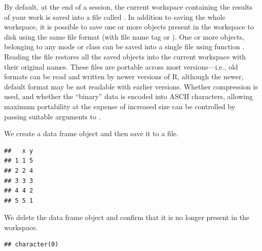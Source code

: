 \documentclass[krantz2]{krantz}\usepackage{knitr}
\begin{document}
By default, at the end of a session, the current workspace containing the results of your work is saved into a file called . In addition to saving the whole workspace, it is possible to save one or more \Rlang objects present in the workspace to disk using the same file format (with file name tag  or ). One or more objects, belonging to any mode or class can be saved into a single file using function . Reading the file restores all the saved objects into the current workspace with their original names. These files are portable across most \Rlang versions---i.e., old formats can be read and written by newer versions of R, although the newer, default format may be not readable with earlier \Rlang versions. Whether compression is used, and whether the ``binary'' data is encoded into ASCII characters, allowing maximum portability at the expense of increased size can be controlled by passing suitable arguments to .

We create a data frame object and then save it to a file.

\begin{knitrout}\footnotesize
{}\color{fgcolor}\begin{kframe}
\begin{alltt}
 \hlkwb{<-} \hlstd{(} \hlstd{=} \hlopt{:}\hlstd{,}  \hlstd{=} \hlopt{:}\hlstd{)}
\end{alltt}
\begin{verbatim}
##   x y
## 1 1 5
## 2 2 4
## 3 3 3
## 4 4 2
## 5 5 1
\end{verbatim}
\begin{alltt}
  \hlstd{=} \hlstd{)}
\end{alltt}
\end{kframe}
\end{knitrout}

We delete the data frame object and confirm that it is no longer present in the workspace.

\begin{knitrout}\footnotesize
{}\color{fgcolor}\begin{kframe}
\begin{alltt}
\hlstd{(} \hlstd{=} \hlstd{)}
\end{alltt}
\begin{verbatim}
## character(0)
\end{verbatim}
\end{kframe}
\end{knitrout}
\end{document}
